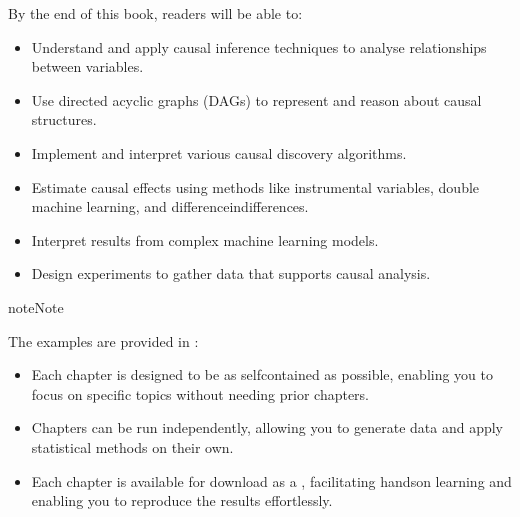 \documentclass[letterpaper,10pt,english]{jupyterBook}
\begin{document}
\sphinxAtStartPar
By the end of this book, readers will be able to:
\begin{itemize}
\item {} 
\sphinxAtStartPar
Understand and apply causal inference techniques to analyse relationships between variables.

\item {} 
\sphinxAtStartPar
Use directed acyclic graphs (DAGs) to represent and reason about causal structures.

\item {} 
\sphinxAtStartPar
Implement and interpret various causal discovery algorithms.

\item {} 
\sphinxAtStartPar
Estimate causal effects using methods like instrumental variables, double machine learning, and difference\sphinxhyphen{}in\sphinxhyphen{}differences.

\item {} 
\sphinxAtStartPar
Interpret results from complex machine learning models.

\item {} 
\sphinxAtStartPar
Design experiments to gather data that supports causal analysis.

\end{itemize}

\begin{sphinxadmonition}{note}{Note}

\sphinxAtStartPar
The examples are provided in :
\begin{itemize}
\item {} 
\sphinxAtStartPar
Each chapter is designed to be as self\sphinxhyphen{}contained as possible, enabling you to focus on specific topics without needing prior chapters.

\item {} 
\sphinxAtStartPar
Chapters can be run independently, allowing you to generate data and apply statistical methods on their own.

\item {} 
\sphinxAtStartPar
Each chapter is available for download as a , facilitating hands\sphinxhyphen{}on learning and enabling you to reproduce the results effortlessly.

\end{itemize}
\end{sphinxadmonition}
\end{document}
